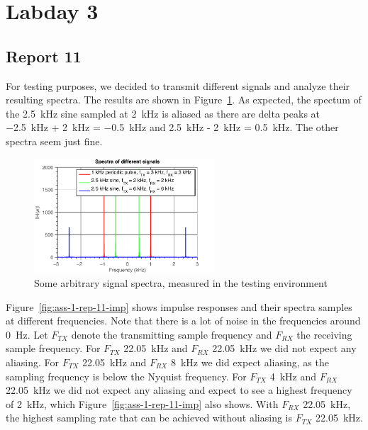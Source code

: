 \documentclass[11pt,titlepage]{report}
\begin{document}
\section{Labday 3}
\subsection{Report 11}
For testing purposes, we decided to transmit different signals and analyze their resulting spectra. The results are shown in Figure~\ref{fig:ass-1-rep-11}. As expected, the spectum of the \SI{2.5}{kHz} sine sampled at \SI{2}{kHz} is aliased as there are delta peaks at \SI{-2.5}{kHz} + \SI{2}{kHz} = \SI{-0.5}{kHz} and \SI{2.5}{kHz} - \SI{2}{kHz} = \SI{0.5}{kHz}. The other spectra seem just fine.

\begin{figure}[H]
	\centering
	\includegraphics[width=0.6\textwidth]{../../deliverable-7-resources/figures/ass-1/report-11-12-13/ass-1-report-11-random-signals.pdf}
	\caption{Some arbitrary signal spectra, measured in the testing environment}
	\label{fig:ass-1-rep-11}
\end{figure}

Figure~\ref{fig:ass-1-rep-11-imp} shows impulse responses and their spectra samples at different frequencies. Note that there is a lot of noise in the frequencies around \SI{0}{Hz}. Let $F_{TX}$ denote the transmitting sample frequency and $F_{RX}$ the receiving sample frequency. For $F_{TX}$ \SI{22.05}{kHz} and $F_{RX}$ \SI{22.05}{kHz} we did not expect any aliasing. For $F_{TX}$ \SI{22.05}{kHz} and $F_{RX}$ \SI{8}{kHz} we did expect aliasing, as the sampling frequency is below the Nyquist frequency. For $F_{TX}$ \SI{4}{kHz} and $F_{RX}$ \SI{22.05}{kHz} we did not expect any aliasing and expect to see a highest frequency of \SI{2}{kHz}, which Figure~\ref{fig:ass-1-rep-11-imp} also shows. With $F_{RX}$ \SI{22.05}{kHz}, the highest sampling rate that can be achieved without aliasing is $F_{TX}$ \SI{22.05}{kHz}.
\end{document}
